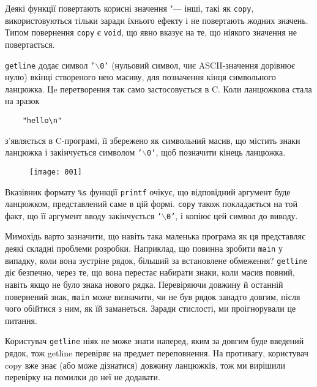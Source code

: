 \documentclass[a4paper,12pt]{book}
\begin{document}
  Деякі функції повертають корисні значення "--- інші, такі як \texttt{copy},
  використовуються тільки заради їхнього ефекту і не повертають жодних значень. Типом
  повернення \texttt{copy} є \texttt{void}, що явно вказує на те, що ніякого значення не
  повертається.

  \texttt{getline} додає символ \texttt{'\mbox{$\backslash$}0'} (нульовий символ, чиє ASCII-значення
  дорівнює нулю) вкінці створеного нею масиву, для позначення кінця символьного ланцюжка.
  Цe перетворення так само застосовується в C. Коли ланцюжкова стала на зразок
  \begin{verbatim}
    "hello\n"
  \end{verbatim}
  з'являється в C-програмі, її збережено як символьний масив, що містить знаки ланцюжка і
  закінчується символом \texttt{'\mbox{$\backslash$}0'}, щоб позначити кінець ланцюжка.

  \begin{figure}[!htb]
  \centering
  \texttt{[image: 001]}
  \end{figure}

  Вказівник формату \texttt{\%s} функції \texttt{printf} очікує, що відповідний аргумент
  буде ланцюжком, представлений саме в цій формі. \texttt{copy} також покладається на той
  факт, що її аргумент вводу закінчується \texttt{'\mbox{$\backslash$}0'}, і копіює цей символ до виводу.

  Мимохідь варто зазначити, що навіть така маленька програма як ця представляє деякі
  складні проблеми розробки. Наприклад, що повинна зробити \texttt{main} у випадку, коли
  вона зустріне рядок, більший за встановлене обмеження? \texttt{getline} діє безпечно,
  через те, що вона перестає набирати знаки, коли масив повний, навіть якщо не було знака
  нового рядка. Перевіряючи довжину й останній повернений знак, \texttt{main} може
  визначити, чи не був рядок занадто довгим, після чого обійтися з ним, як їй заманеться.
  Заради стислості, ми проігнорували це питання.

  Користувач \texttt{getline} ніяк не може знати наперед, яким за довгим буде введений
  рядок, тож getline перевіряє на предмет переповнення. На противагу, користувач copy вже
  знає (або може дізнатися) довжину ланцюжків, тож ми вирішили перевірку на помилки до неї
  не додавати.
\end{document}
